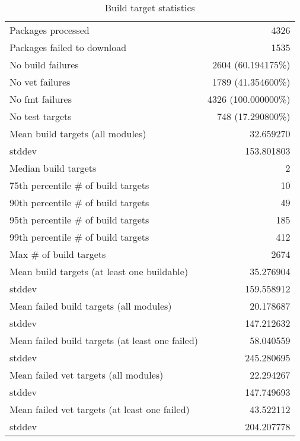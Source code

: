 \begin{table}[ht]
\caption{Build target statistics}
\label{table:build}
\begin{tabular}{|l|r|}
 \hline
  Packages processed & 4326 \\
  Packages failed to download & 1535 \\
  No build failures & 2604 (60.194175\%) \\
  No vet failures & 1789 (41.354600\%) \\
  No fmt failures & 4326 (100.000000\%) \\
  No test targets & 748 (17.290800\%) \\
 \hline
  Mean build targets (all modules)& 32.659270 \\
  stddev & 153.801803 \\
  Median build targets & 2 \\
  75th percentile \# of build targets & 10 \\
  90th percentile \# of build targets & 49 \\
  95th percentile \# of build targets & 185 \\
  99th percentile \# of build targets & 412 \\
  Max \# of build targets & 2674 \\
 \hline
  Mean build targets (at least one buildable)& 35.276904 \\
  stddev & 159.558912 \\
 \hline
  Mean failed build targets (all modules)& 20.178687 \\
  stddev & 147.212632 \\
 \hline
  Mean failed build targets (at least one failed)& 58.040559 \\
  stddev & 245.280695 \\
 \hline
  Mean failed vet targets (all modules)& 22.294267 \\
  stddev & 147.749693 \\
 \hline
  Mean failed vet targets (at least one failed)& 43.522112 \\
  stddev & 204.207778 \\
 \hline
\end{tabular}
\end{table}

